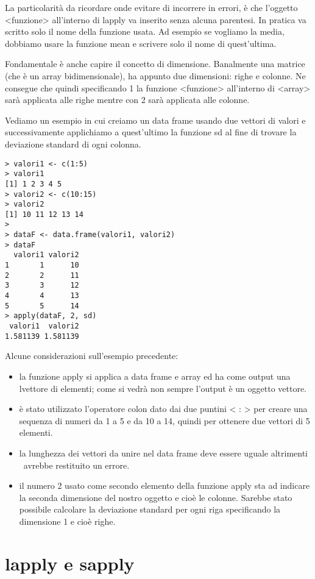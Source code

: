 La particolarità da ricordare onde evitare di incorrere in errori, è che l'oggetto \textsf{<funzione>} all'interno di \textsf{lapply} va inserito senza alcuna parentesi. In pratica va scritto solo il nome della funzione usata. Ad esempio se vogliamo la media, dobbiamo usare la funzione \textsf{mean} e scrivere solo il nome di quest'ultima.

Fondamentale è anche capire il concetto di dimensione. Banalmente una matrice (che è un array bidimensionale), ha appunto due dimensioni: righe e colonne. Ne consegue che quindi specificando 1 la funzione \textsf{<funzione>} all'interno di \textsf{<array>} sarà applicata alle righe mentre con 2 sarà applicata alle colonne.

Vediamo un esempio in cui creiamo un data frame usando due vettori di valori e successivamente applichiamo a quest'ultimo la funzione \textsf{sd} al fine di trovare la deviazione standard di ogni colonna.
\begin{lstlisting}
> valori1 <- c(1:5)
> valori1
[1] 1 2 3 4 5
> valori2 <- c(10:15)
> valori2
[1] 10 11 12 13 14
>
> dataF <- data.frame(valori1, valori2)
> dataF
  valori1 valori2
1       1      10
2       2      11
3       3      12
4       4      13
5       5      14
> apply(dataF, 2, sd)
 valori1  valori2 
1.581139 1.581139 
\end{lstlisting}

Alcune considerazioni sull'esempio precedente:
\begin{itemize}
\item la funzione \textsf{apply} si applica a data frame e array ed ha come output una lvettore di elementi; come si vedrà non sempre l'output è un oggetto vettore.
\item è stato utilizzato l'operatore \textsf{colon} dato dai due puntini \textsf{< : >} per creare una sequenza di numeri da 1 a 5 e da 10 a 14, quindi per ottenere due vettori di 5 elementi.
\item la lunghezza dei vettori da unire nel data frame deve essere uguale altrimenti \erre\ avrebbe restituito un errore.
\item il numero 2 usato come secondo elemento della funzione \textsf{apply} sta ad indicare la seconda dimensione del nostro oggetto e cioè le colonne. Sarebbe stato possibile calcolare la deviazione standard per ogni riga specificando la dimensione 1 e cioè righe.
\end{itemize}


\section{lapply e sapply}

